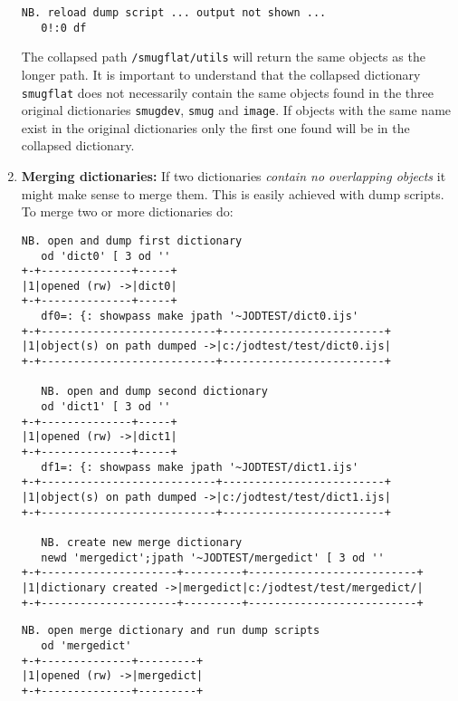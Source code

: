 \begin{enumerate}
\begin{lstlisting}[frame=single,framerule=0pt,basicstyle=\ttfamily\footnotesize]
   NB. reload dump script ... output not shown ...  
   0!:0 df
\end{lstlisting}

The collapsed path \texttt{/smugflat/utils} will return the same objects as the longer path.
It is important to understand that the collapsed dictionary \texttt{smugflat} does not necessarily contain
the same objects found in the three original dictionaries \texttt{smugdev}, \texttt{smug} and \texttt{image}.
If objects with the same name exist in the original dictionaries only the first one found will 
be in the collapsed dictionary.


\item \textbf{Merging dictionaries:} If two dictionaries \emph{contain no overlapping objects} it might make
sense to merge them. This is easily achieved with dump scripts. To merge two or more dictionaries do:

\begin{lstlisting}[frame=single,framerule=0pt,basicstyle=\ttfamily\footnotesize]
   NB. open and dump first dictionary
   od 'dict0' [ 3 od ''
+-+--------------+-----+
|1|opened (rw) ->|dict0|
+-+--------------+-----+
   df0=: {: showpass make jpath '~JODTEST/dict0.ijs'
+-+---------------------------+-------------------------+
|1|object(s) on path dumped ->|c:/jodtest/test/dict0.ijs|
+-+---------------------------+-------------------------+
   
   NB. open and dump second dictionary
   od 'dict1' [ 3 od ''
+-+--------------+-----+
|1|opened (rw) ->|dict1|
+-+--------------+-----+
   df1=: {: showpass make jpath '~JODTEST/dict1.ijs'
+-+---------------------------+-------------------------+
|1|object(s) on path dumped ->|c:/jodtest/test/dict1.ijs|
+-+---------------------------+-------------------------+   
  
   NB. create new merge dictionary
   newd 'mergedict';jpath '~JODTEST/mergedict' [ 3 od ''
+-+---------------------+---------+--------------------------+
|1|dictionary created ->|mergedict|c:/jodtest/test/mergedict/|
+-+---------------------+---------+--------------------------+
\end{lstlisting}

   \newpage
   
\begin{lstlisting}[frame=single,framerule=0pt,basicstyle=\ttfamily\footnotesize]   
   NB. open merge dictionary and run dump scripts
   od 'mergedict'
+-+--------------+---------+
|1|opened (rw) ->|mergedict|
+-+--------------+---------+


\end{lstlisting}
\end{enumerate}
